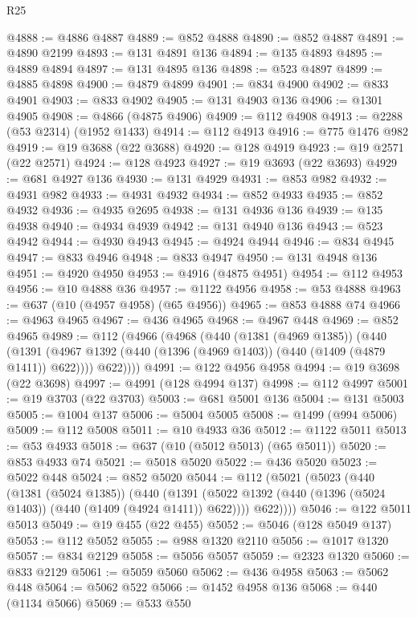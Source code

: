 \begin{lexlean}{R25}
\begin{coremodule}
@4888 := @4886 @4887
@4889 := @852 @4888
@4890 := @852 @4887
@4891 := @4890 @2199
@4893 := @131 @4891 @136
@4894 := @135 @4893
@4895 := @4889 @4894
@4897 := @131 @4895 @136
@4898 := @523 @4897
@4899 := @4885 @4898
@4900 := @4879 @4899
@4901 := @834 @4900
@4902 := @833 @4901
@4903 := @833 @4902
@4905 := @131 @4903 @136
@4906 := @1301 @4905
@4908 := @4866 (@4875 @4906)
@4909 := @112 @4908
@4913 := @2288 (@53 @2314) (@1952 @1433)
@4914 := @112 @4913
@4916 := @775 @1476 @982
@4919 := @19 @3688 (@22 @3688)
@4920 := @128 @4919
@4923 := @19 @2571 (@22 @2571)
@4924 := @128 @4923
@4927 := @19 @3693 (@22 @3693)
@4929 := @681 @4927 @136
@4930 := @131 @4929
@4931 := @853 @982
@4932 := @4931 @982
@4933 := @4931 @4932
@4934 := @852 @4933
@4935 := @852 @4932
@4936 := @4935 @2695
@4938 := @131 @4936 @136
@4939 := @135 @4938
@4940 := @4934 @4939
@4942 := @131 @4940 @136
@4943 := @523 @4942
@4944 := @4930 @4943
@4945 := @4924 @4944
@4946 := @834 @4945
@4947 := @833 @4946
@4948 := @833 @4947
@4950 := @131 @4948 @136
@4951 := @4920 @4950
@4953 := @4916 (@4875 @4951)
@4954 := @112 @4953
@4956 := @10 @4888 @36
@4957 := @1122 @4956
@4958 := @53 @4888
@4963 := @637 (@10 (@4957 @4958) (@65 @4956))
@4965 := @853 @4888 @74
@4966 := @4963 @4965
@4967 := @436 @4965
@4968 := @4967 @448
@4969 := @852 @4965
@4989 := @112
    (@4966
      (@4968
        (@440
          (@1381 (@4969 @1385))
          (@440
            (@1391 (@4967 @1392 (@440 (@1396 (@4969 @1403)) (@440 (@1409 (@4879 @1411)) @622))))
            @622))))
@4991 := @122 @4956 @4958
@4994 := @19 @3698 (@22 @3698)
@4997 := @4991 (@128 @4994 @137)
@4998 := @112 @4997
@5001 := @19 @3703 (@22 @3703)
@5003 := @681 @5001 @136
@5004 := @131 @5003
@5005 := @1004 @137
@5006 := @5004 @5005
@5008 := @1499 (@994 @5006)
@5009 := @112 @5008
@5011 := @10 @4933 @36
@5012 := @1122 @5011
@5013 := @53 @4933
@5018 := @637 (@10 (@5012 @5013) (@65 @5011))
@5020 := @853 @4933 @74
@5021 := @5018 @5020
@5022 := @436 @5020
@5023 := @5022 @448
@5024 := @852 @5020
@5044 := @112
    (@5021
      (@5023
        (@440
          (@1381 (@5024 @1385))
          (@440
            (@1391 (@5022 @1392 (@440 (@1396 (@5024 @1403)) (@440 (@1409 (@4924 @1411)) @622))))
            @622))))
@5046 := @122 @5011 @5013
@5049 := @19 @455 (@22 @455)
@5052 := @5046 (@128 @5049 @137)
@5053 := @112 @5052
@5055 := @988 @1320 @2110
@5056 := @1017 @1320
@5057 := @834 @2129
@5058 := @5056 @5057
@5059 := @2323 @1320
@5060 := @833 @2129
@5061 := @5059 @5060
@5062 := @436 @4958
@5063 := @5062 @448
@5064 := @5062 @522
@5066 := @1452 @4958 @136
@5068 := @440 (@1134 @5066)
@5069 := @533 @550

\end{coremodule}
\end{lexlean}
